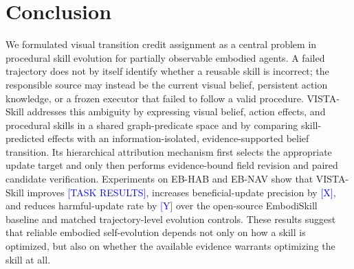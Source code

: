 \section{Conclusion}

We formulated visual transition credit assignment as a central problem in procedural skill evolution for partially observable embodied agents. A failed trajectory does not by itself identify whether a reusable skill is incorrect; the responsible source may instead be the current visual belief, persistent action knowledge, or a frozen executor that failed to follow a valid procedure. VISTA-Skill addresses this ambiguity by expressing visual belief, action effects, and procedural skills in a shared graph-predicate space and by comparing skill-predicted effects with an information-isolated, evidence-supported belief transition. Its hierarchical attribution mechanism first selects the appropriate update target and only then performs evidence-bound field revision and paired candidate verification. Experiments on EB-HAB and EB-NAV show that VISTA-Skill improves \textcolor{blue}{[TASK RESULTS]}, increases beneficial-update precision by \textcolor{blue}{[X]}, and reduces harmful-update rate by \textcolor{blue}{[Y]} over the open-source EmbodiSkill baseline and matched trajectory-level evolution controls. These results suggest that reliable embodied self-evolution depends not only on how a skill is optimized, but also on whether the available evidence warrants optimizing the skill at all.
